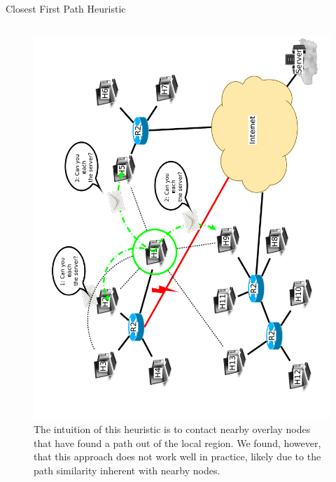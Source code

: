 \documentclass[pdftex]{beamer}
\begin{document}
\begin{frame}{Closest First Path Heuristic}
\begin{columns}
\begin{column}{.5\textwidth}
\begin{figure}
\includegraphics[height=\textwidth,angle=-90]{nearest_neighbor}
\caption{The intuition of this heuristic is to contact nearby overlay nodes that have found a path out of the local region.  We found, however, that this approach does not work well in practice, likely due to the path similarity inherent with nearby nodes.}
\end{figure}
\end{column}

\end{columns}
\end{frame}


\end{document}
